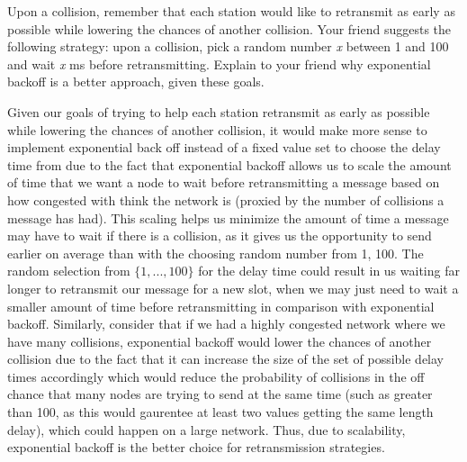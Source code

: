 \documentclass[10pt]{article}
\newenvironment{problem}[2][]{\begin{trivlist}
\item[\hskip \labelsep {\bfseries #1}\hskip \labelsep {\bfseries #2.}]}{\end{trivlist}}
\begin{document}
\begin{problem}{3: Exponential Backoff}

Upon a collision, remember that each station would like to retransmit as early as possible while lowering the chances of another collision. Your friend suggests the following strategy: upon a collision, pick a random number \emph{x} between 1 and 100 and wait \emph{x} ms before retransmitting. Explain to your friend why exponential backoff is a better approach, given these goals.

\end{problem}
Given our goals of trying to help each station retransmit as early as possible while lowering the chances of another collision, it would make more sense to implement exponential back off instead of a fixed value set to choose the delay time from due to the fact that exponential backoff allows us to scale the amount of time that we want a node to wait before retransmitting a
message based on how congested with think the network is (proxied by the number of collisions a message has had). This scaling helps us minimize the amount of time a message may have to wait if there is a collision, as it gives us the opportunity to send earlier on average than with the choosing random number from 1, 100. The random selection from $\{1,...,100\}$ for the delay time could result in us waiting far longer to retransmit our message for a new slot,
when we may just need to wait a smaller amount of time before retransmitting in comparison with exponential backoff. Similarly, consider that if we had a highly congested network where we have many collisions, exponential backoff would lower the chances of another collision due to the fact that it can increase the size of the set of possible delay times accordingly which would reduce the probability of collisions in the off chance that 
many nodes are trying to send at the same time (such as greater than 100, as this would gaurentee at least two values getting the same length delay), which could happen on a large network. Thus, due to scalability, exponential backoff is the better choice for retransmission strategies.
\end{document}
